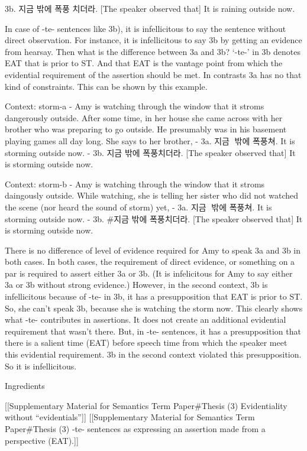 3b. 지금 밖에 폭풍 치더라. {[}The speaker observed that{]} It is raining
outside now.

In case of -te- sentences like 3b), it is infellicitous to say the
sentence without direct observation. For instance, it is infellicitous
to say 3b by getting an evidence from hearsay. Then what is the
difference between 3a and 3b? `-te-' in 3b denotes EAT that is prior to
ST. And that EAT is the vantage point from which the evidential
requirement of the assertion should be met. In contrasts 3a has no that
kind of constraints. This can be shown by this example.

Context: storm-a - Amy is watching through the window that it stroms
dangerously outside. After some time, in her house she came across with
her brother who was preparing to go outside. He presumably was in his
basement playing games all day long. She says to her brother, - 3a. 지금
밖에 폭풍쳐. It is storming outside now. - 3b. 지금 밖에 폭풍치더라.
{[}The speaker observed that{]} It is storming outside now.

Context: storm-b - Amy is watching through the window that it stroms
daingously outside. While watching, she is telling her sister who did
not watched the scene (nor heard the sound of storm) yet, - 3a. 지금
밖에 폭풍쳐. It is storming outside now. - 3b. \#지금 밖에 폭풍치더라.
{[}The speaker observed that{]} It is storming outside now.

There is no difference of level of evidence required for Amy to speak 3a
and 3b in both cases. In both cases, the requirement of direct evidence,
or something on a par is required to assert either 3a or 3b. (It is
infelicitous for Amy to say either 3a or 3b without strong evidence.)
However, in the second context, 3b is infellicitous because of -te- in
3b, it has a presupposition that EAT is prior to ST. So, she can't speak
3b, because she is watching the storm now. This clearly shows what -te-
contributes in assertions. It does not create an additional evidential
requirement that wasn't there. But, in -te- sentences, it has a
presupposition that there is a salient time (EAT) before speech time
from which the speaker meet this evidential requirement. 3b in the
second context violated this presupposition. So it is infellicitous.

Ingredients

{[}{[}Supplementary Material for Semantics Term Paper\#Thesis (3)
Evidentiality without ``evidentials''{]}{]} {[}{[}Supplementary Material
for Semantics Term Paper\#Thesis (3) -te- sentences as expressing an
assertion made from a perspective (EAT).{]}{]}

